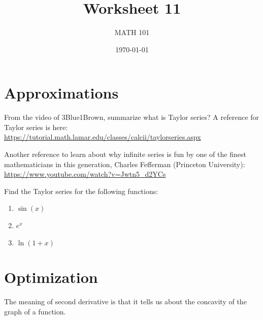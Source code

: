 \documentclass[12pt]{amsart}
\title{ Worksheet 11}
\author{MATH 101}
\date{\today}
\begin{document}
\maketitle

\section*{Approximations}

\begin{question}
	From the video of 3Blue1Brown, summarize what is Taylor series?
	A reference for Taylor series is here: \url{https://tutorial.math.lamar.edu/classes/calcii/taylorseries.aspx}

	Another reference to learn about why infinite series is fun by
	one of the finest mathematicians in this generation, Charles Fefferman (Princeton University):
	\url{https://www.youtube.com/watch?v=Jwtn5_d2YCs}
\end{question}

\newpage

\begin{question}
	Find the Taylor series for the following functions:
	\begin{enumerate}
		\item $\sin(x)$
		      \vspace{5cm}
		\item $e^x$
		      \vspace{5cm}
		\item $\ln (1 + x) $
		      \vspace{5cm}
	\end{enumerate}
\end{question}



\newpage






\section*{Optimization}

The meaning of second derivative is that it tells us about the concavity of the graph of a function.
\end{document}
